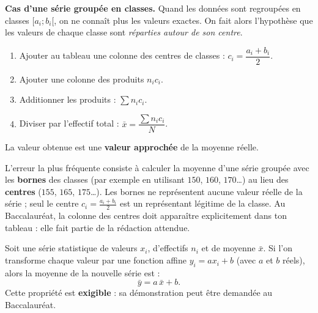 \documentclass[11pt]{article}
\newcommand{\cle}[1]{{\popxbold\color{popdark}#1}}
\begin{document}
\textbf{Cas d'une série groupée en classes.} Quand les données sont regroupées en classes $[a_i ; b_i[$, on ne connaît plus les valeurs exactes. On fait alors l'hypothèse que les valeurs de chaque classe sont \emph{réparties autour de son centre}.

\begin{methode}
\begin{enumerate}
\item Ajouter au tableau une colonne des \cle{centres de classes} : $c_i = \dfrac{a_i + b_i}{2}$.
\item Ajouter une colonne des produits $n_i c_i$.
\item Additionner les produits : $\sum n_i c_i$.
\item Diviser par l'effectif total : $\bar{x} = \dfrac{\sum n_i c_i}{N}$.
\end{enumerate}
La valeur obtenue est une \textbf{valeur approchée} de la moyenne réelle.
\end{methode}

\begin{attention}
L'erreur la plus fréquente consiste à calculer la moyenne d'une série groupée avec les \textbf{bornes} des classes (par exemple en utilisant $150$, $160$, $170$\ldots) au lieu des \textbf{centres} ($155$, $165$, $175$\ldots). Les bornes ne représentent aucune valeur réelle de la série ; seul le centre $c_i = \frac{a_i+b_i}{2}$ est un représentant légitime de la classe. Au Baccalauréat, la colonne des centres doit apparaître explicitement dans ton tableau : elle fait partie de la rédaction attendue.
\end{attention}

\begin{propriete}
Soit une série statistique de valeurs $x_i$, d'effectifs $n_i$ et de moyenne $\bar{x}$. Si l'on transforme chaque valeur par une fonction affine $y_i = a x_i + b$ (avec $a$ et $b$ réels), alors la moyenne de la nouvelle série est :
\[ \bar{y} = a\,\bar{x} + b. \]
Cette propriété est \textbf{exigible} : sa démonstration peut être demandée au Baccalauréat.
\end{propriete}
\end{document}
